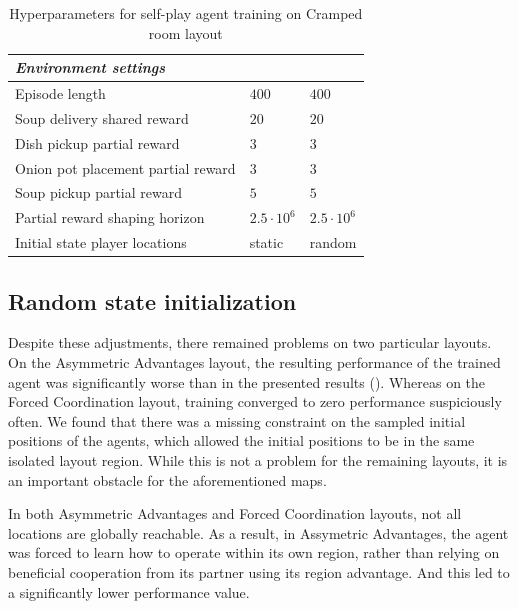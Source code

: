 \begin{table}[htbp]
\begin{tabular}{lll}
      \textit{Environment settings}                &                                   &                                   \\ \midrule                                
      Episode length                               & $400$                             & $400$                             \\
      Soup delivery shared reward                  & $20$                              & $20$                              \\
      Dish pickup partial reward                   & $3$                               & $3$                               \\
      Onion pot placement partial reward           & $3$                               & $3$                               \\
      Soup pickup partial reward                   & $5$                               & $5$                               \\
      Partial reward shaping horizon               & $2.5\cdot 10^6$                   & $2.5\cdot 10^6$                   \\
      Initial state player locations               & static                            & random                            \\
     \bottomrule
    \end{tabular}
    \caption{Hyperparameters for self-play agent training on Cramped room layout}
    \label{tab:hyperparameters-algo}
  \end{table}
  


\subsection{Random state initialization}
Despite these adjustments, there remained problems on two particular layouts.
On the Asymmetric Advantages layout, the resulting performance of the trained agent was significantly worse than in the presented results (\cite{carroll2020utility}).
Whereas on the Forced Coordination layout, training converged to zero performance suspiciously often.
We found that there was a missing constraint on the sampled initial positions of the agents, which allowed the initial positions to be in the same isolated layout region.
While this is not a problem for the remaining layouts, it is an important obstacle for the aforementioned maps.

In both Asymmetric Advantages and Forced Coordination layouts, not all locations are globally reachable.
As a result, in Assymetric Advantages, the agent was forced to learn how to operate within its own region, rather than relying on beneficial cooperation from its partner using its region advantage.
And this led to a significantly lower performance value.

